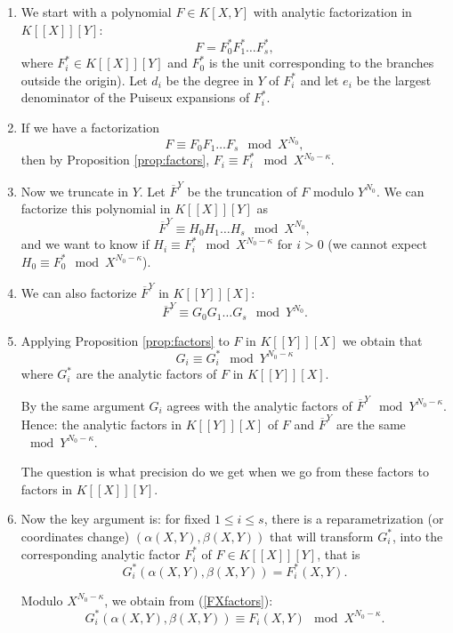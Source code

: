 \documentclass[a4paper,11pt,reqno]{amsart}%
\theoremstyle{definition}
\theoremstyle{plain}
\theoremstyle{remark}
\begin{document}
\begin{enumerate}
\item We start with a polynomial $F \in K[X,Y]$ with analytic factorization in $K[[X]][Y]$:
$$
F = F_0^* F_1^* \dots F_s^*,$$
where $F_i^* \in K[[X]][Y]$ and $F_0^*$ is the unit corresponding to the branches outside the origin). Let $d_i$ be the degree in $Y$ of $F_i^*$ and let $e_i$ be the largest denominator of the Puiseux expansions of $F_i^*$.

\item If we have a factorization
\begin{equation} \label{FXfactors}
F \equiv  F_0 F_1 \dots F_s \mod X^{N_0},
\end{equation}
then by Proposition \ref{prop:factors}, $F_i \equiv F_i^* \mod X^{N_0 - \kappa}$.


\item Now we truncate in $Y$. Let $\overline{F}^{Y}$ be the truncation of $F$ modulo $Y^{N_0}$. We can factorize this polynomial in $K[[X]][Y]$ as
$$
\overline{F}^{Y} \equiv  {H}_0 {H}_1 \dots {H}_s \mod X^{N_0},
$$
and we want to know if ${H}_i \equiv F^*_i \mod X^{N_0 - \kappa}$ for $i > 0$ (we cannot expect $H_0 \equiv F_0^* \mod X^{N_0 - \kappa}$).

\item We can also factorize $\overline{F}^{Y}$ in $K[[Y]][X]$: 
$$\overline{F}^{Y} \equiv G_0 G_1 \dots G_s \mod Y^{N_0}.$$

\item Applying Proposition \ref{prop:factors} to ${F}$ in $K[[Y]][X]$  we obtain that
$$G_i \equiv G_i^* \mod Y^{N_0 - \kappa}$$
where $G_i^*$ are the analytic factors of $F$ in $K[[Y]][X]$.

By the same argument $G_i$ agrees with the analytic factors of $\overline{F}^{Y} \mod Y^{N_0 - \kappa}$.
Hence: the analytic factors in $K[[Y]][X]$ of $F$ and $\overline{F}^{Y}$ are the same $\mod Y^{N_0 - \kappa}$.

The question is what precision do we get when we go from these factors to factors in $K[[X]][Y]$.

\item Now the key argument is: for fixed $1 \le i \le s$, there is a reparametrization (or coordinates change) $(\alpha(X,Y), \beta(X,Y))$ that will transform $G_i^*$, into the corresponding analytic factor $F_i^*$ of $F \in K[[X]][Y]$, that is
$$
G_i^*(\alpha(X,Y), \beta(X,Y)) = F_i^*(X,Y).
$$

Modulo $X^{N_0-\kappa}$, we obtain from (\ref{FXfactors}):
$$
G_i^*(\alpha(X,Y), \beta(X,Y)) \equiv F_i(X,Y) \mod X^{N_0-\kappa}.
$$


\end{enumerate}
\end{document}
